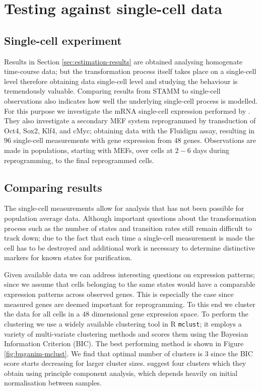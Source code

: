 \section{Testing against single-cell data}
\label{sec:test-single-cell}

\subsection{Single-cell experiment}
\label{sec:single-cell-exper}

Results in Section \ref{sec:estimation-results} are obtained analysing homogenate time-course data; but the transformation process itself takes place on a single-cell level therefore obtaining data single-cell level and studying the behaviour is tremendously valuable. Comparing results from STAMM to single-cell observations also indicates how well the underlying single-cell process is modelled. For this purpose we investigate the mRNA single-cell expression performed by \cite{Buganim:2012hp}. They also investigate a secondary MEF system reprogrammed by transduction of Oct4, Sox2, Klf4, and cMyc; obtaining data with the Fluidigm assay, resulting in $96$ single-cell measurements with gene expression from $48$ genes. Observations are made in populations, starting with MEFs, over cells at $2 - 6$ days during reprogramming, to the final reprogrammed cells.

\subsection{Comparing results}
\label{sec:comparing-results}

The single-cell measurements \citep{Buganim:2012hp} allow for analysis that has not been possible for population average data. Although important questions about the transformation process such as the number of states and transition rates still remain difficult to track down; due to the fact that each time a single-cell measurement is made the cell has to be destroyed and additional work is necessary to determine distinctive markers for known states for purification.

Given available data we can address interesting questions on expression patterns; since we assume that cells belonging to the same states would have a comparable expression patterns across observed genes. This is especially the case since measured genes are deemed important for reprogramming. To this end we cluster the data for all cells in a $48$ dimensional gene expression space. To perform the clustering we use a widely available clustering tool in R \texttt{mclust}; it employs a variety of multi-variate clustering methods and scores them using the Bayesian Information Criterion (BIC). The best performing method is shown in Figure \ref{fig:buganim-mclust}. We find that optimal number of clusters is $3$ since the BIC score starts decreasing for larger cluster sizes. \cite{Buganim:2012hp} suggest four clusters which they obtain using principle component analysis, which depends heavily on initial normalisation between samples.

